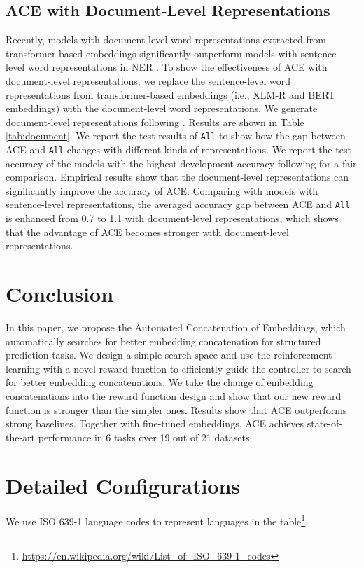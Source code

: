 \documentclass{article} \usepackage{iclr2021_conference,times}
\begin{document}
\subsection{ACE with Document-Level Representations}
Recently, models with document-level word representations extracted from transformer-based embeddings significantly outperform models with sentence-level word representations in NER \citep{devlin-etal-2019-bert,yu-etal-2020-named}. To show the effectiveness of ACE with document-level representations, we replace the sentence-level word representations from transformer-based embeddings (i.e., XLM-R and BERT embeddings) with the document-level word representations. We generate document-level representations following \citet{yu-etal-2020-named}. Results are shown in Table \ref{tab:document}. We report the test results of \texttt{All} to show how the gap between ACE and \texttt{All} changes with different kinds of representations. We report the test accuracy of the models with the highest development accuracy following \citet{yu-etal-2020-named} for a fair comparison. Empirical results show that the document-level representations can significantly improve the accuracy of ACE. Comparing with models with sentence-level representations, the averaged accuracy gap between ACE and \texttt{All} is enhanced from 0.7 to 1.1 with document-level representations, which shows that the advantage of ACE becomes stronger with document-level representations.


\section{Conclusion}
In this paper, we propose the Automated Concatenation of Embeddings, which automatically searches for better embedding concatenation for structured prediction tasks. We design a simple search space and use the reinforcement learning with a novel reward function to efficiently guide the controller to search for better embedding concatenations. We take the change of embedding concatenations into the reward function design and show that our new reward function is stronger than the simpler ones. Results show that ACE outperforms strong baselines. Together with fine-tuned embeddings, ACE achieves state-of-the-art performance in 6 tasks over 19 out of 21 datasets.






\appendix
\section{Detailed Configurations}
We use ISO 639-1 language codes to represent languages in the table\footnote{\url{https://en.wikipedia.org/wiki/List_of_ISO_639-1_codes}}.
\end{document}
